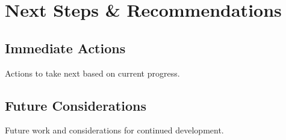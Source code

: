 \documentclass{book}
\begin{document}
\chapter{Next Steps \& Recommendations}

\section{Immediate Actions}
Actions to take next based on current progress.

\section{Future Considerations}
Future work and considerations for continued development.
\backmatter
{}
\printindex
\end{document}
